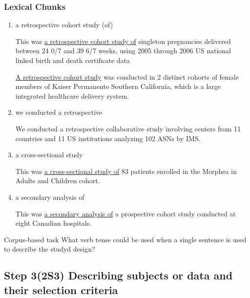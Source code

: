 \documentclass[a4paper]{ctexbook}
\begin{document}
    \subsubsection{Lexical Chunks}

    \begin{enumerate}
      \item a retrospective cohort study (of)
      \begin{eg}{}
        This was \uline{a retrospective cohort study of} singleton pregnancies delivered between 24 0/7 and 39 6/7 weeks, using 2005 through 2006 US national linked birth and death certificate data
      \end{eg}
      
      \begin{eg}{}
        \uline{A retrospective cohort study} was conducted in 2 distinct cohorts of female members of Kaiser Permanente Southern California, which is a large integrated healthcare delivery system.
      \end{eg}

      \item we conducted a retrospective
      \begin{eg}{}
        We conducted a retrospective collaborative study involving centers from 11 countries and 11 US institutions analyzing 102 ASNs by IMS.
      \end{eg}

      \item a cross-sectional study
      \begin{eg}{}
        This was \uline{a cross-sectional study of} 83 patients enrolled in the Morphea in Adults and Children cohort.
      \end{eg}

      \item a secondary analysis of
      \begin{eg}{}
        This was \uline{a secondary analysis of} a prospective cohort study conducted at eight Canadian hospitals.
      \end{eg}
    \end{enumerate}

    \begin{task}{\heiti Corpus-based task}
      What verb tense could be used when a single sentence is used to describe the studyd design?
    \end{task}

  \subsection{Step 3(2S3) Describing subjects or data and their selection criteria}
\end{document}

